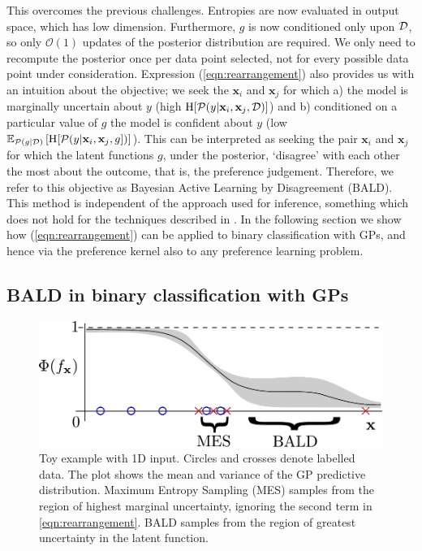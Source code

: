 \vspace{-0.65cm}
\normalsize This overcomes the previous challenges. Entropies are now evaluated in
output space, which has low dimension. Furthermore, $g$ is now conditioned only upon $\mathcal{D}$,
so only $\mathcal{O}(1)$ updates of the posterior distribution are required. 
We only need to recompute the posterior once per data point selected, not for every possible data point under consideration.
Expression (\ref{eqn:rearrangement}) also provides us with an intuition about the objective;
we seek the $\mathbf{x}_i$ and $\mathbf{x}_j$ for which a) the model is marginally
uncertain about $y$ (high $\mathrm{H}[\mathcal{P}(y | \mathbf{x}_i,\mathbf{x}_j, \mathcal{D})]$) and
b) conditioned on a particular value of $g$ the model is confident about $y$
(low $\mathbb{E}_{\mathcal{P}(g|\mathcal{D})} \left[\mathrm{H} [ \mathcal{P}(y |\mathbf{x}_i,\mathbf{x}_j,g] \right)]$).
This can be interpreted as seeking the pair $\mathbf{x}_i$ and $\mathbf{x}_j$ for which the latent functions $g$, under the posterior, `disagree' with each other the most about the outcome, that is, the preference judgement.
Therefore, we refer to this objective as Bayesian Active Learning by Disagreement (BALD).
This method is independent of the approach used for inference, something which does not hold for
the techniques described in \cite{mackay1992, krishnapuram2004, lawrence2002}. 
In the following section we show how (\ref{eqn:rearrangement}) can be applied to binary classification with GPs, and hence via the preference kernel also to any preference learning problem.


\subsection{BALD in binary classification with GPs}

\begin{figure}
\includegraphics[scale = 0.45]{figs/BALD_eg.pdf}
\caption{Toy example with 1D input. Circles and crosses
denote labelled data. The plot shows the mean and variance of the GP predictive
distribution. Maximum Entropy Sampling (MES)
samples from the region of highest marginal uncertainty, ignoring the
second term in \eqref{eqn:rearrangement}. BALD samples 
from the region of greatest uncertainty in the latent function.\label{fig:BALD}}
\end{figure}

